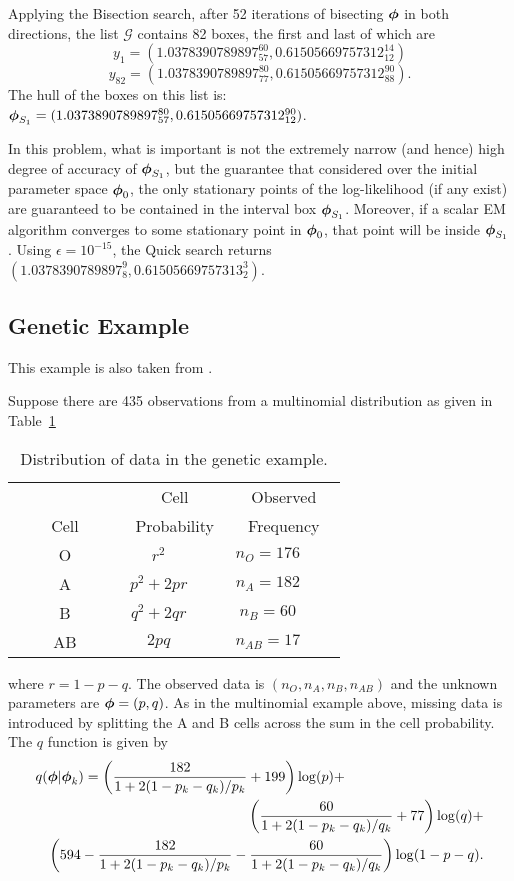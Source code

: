 Applying the Bisection search, 
after 52 iterations of bisecting $\mbox{\boldmath $\phi$}$ in both directions, the list
$\mathcal{G}$ contains 82 boxes, the first and last of which are
$$y_1 = (1.0378390789897_{57}^{60}, 0.61505669757312_{12}^{14})$$
$$y_{82} = (1.0378390789897_{77}^{80}, 0.61505669757312_{88}^{90}).$$
The hull of the boxes on this list is:
$\mbox{\boldmath $\phi$}_{S_1} = (1.0373890789897_{57}^{80},  0.61505669757312_{12}^{90})$.

In this problem, what is important is not the extremely narrow (and
hence) high degree of accuracy of $\mbox{\boldmath $\phi$}_{S_1}$, but the guarantee
that considered over the initial parameter space $\mbox{\boldmath $\phi$}_0$, the
only stationary points of the log-likelihood (if any exist)
are guaranteed to be contained in the interval box $\mbox{\boldmath $\phi$}_{S_1}$.
Moreover, if a scalar EM algorithm converges to some stationary point in
$\mbox{\boldmath $\phi$}_0$, that point will be inside $\mbox{\boldmath $\phi$}_{S_1}$.
Using $\epsilon = 10^{-15}$, the Quick search returns 
$(1.0378390789897_8^9,0.61505669757313_2^3)$.

\subsection{Genetic Example}

This example is also taken from \cite{McLachlan:Book}.

Suppose there are 435 observations from a multinomial distribution
as given in Table~\ref{genetic:table}
\newdimen\captionwidth \captionwidth=4.02in
\begin{table}[!ht]
\caption{Distribution of data in the genetic example. 
\label{genetic:table}}
\begin{center}
\begin{tabular}{c|c|c}
&     Cell         &   Observed \\
Cell & Probability &  Frequency \\ \hline
$\qquad$ O $\qquad$ & \qquad $r^2\qquad $ & \qquad $n_O = 176\qquad $ \\
$\qquad$ A  $\qquad$ & \qquad $p^2 + 2pr\qquad $ & \qquad $n_A = 182\qquad $ \\
$\qquad$ B  $\qquad$ & \qquad $q^2 + 2qr\qquad $ & \qquad $n_B = 60\qquad $ \\
$\qquad$ AB $\qquad$ & \qquad $2pq\qquad $ & \qquad $n_{AB} = 17\qquad $ \\
\end{tabular}
\end{center}
\end{table}
where $r= 1-p-q$.  
The observed data is $(n_O, n_A, n_B, n_{AB})$ 
and the unknown parameters are $\mbox{\boldmath $\phi$} = (p,q)$.
As in the multinomial example above, 
missing data is introduced by splitting the A and B cells across the sum in the
cell probability.  The $q$ function is given by 
\begin{eqnarray}
\lefteqn{ q(\bfphi|\bfphi_k) = \left(\frac{182}{1+2(1-p_k-q_k)/p_k} +
199\right) \log(p) + } \nonumber \\ \nonumber
& & \left(\frac{60}{1+2(1-p_k-q_k)/q_k} + 77\right) \log(q) + \\
& &  \left( 594 - \frac{182}{1+2(1-p_k-q_k)/p_k} -
\frac{60}{1+2(1-p_k-q_k)/q_k}\right) \log(1-p-q).
\end{eqnarray}

